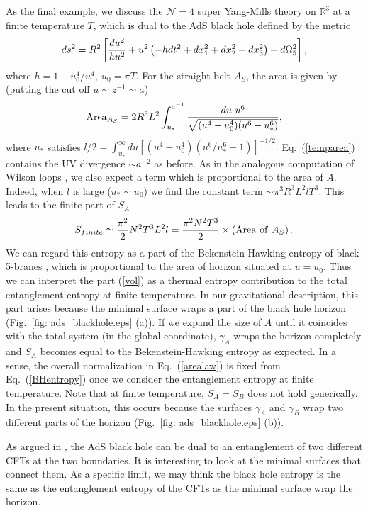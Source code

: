 \documentclass[twocolumn,amsmath,amssymb,nofootinbib,eqsecnum,tighten,prd]{revtex4}
\def\frac#1#2{{#1\over #2}}
\def\s{\sqrt}
\def\f {\frac}
\def\frac#1#2{{#1\over #2}}
\def\s{\sqrt}
\def\be{\begin{equation}}
\def\ee{\end{equation}}
\begin{document}
As the final example, we discuss the $\mathcal{N}=4$
super Yang-Mills theory on $\mathbb{R}^3$ at a finite
temperature $T$, which is dual to the AdS black hole
defined by the metric
\cite{Witten}
\be ds^2=R^2\left[\f{du^2}{hu^2}+u^2\left(-h
dt^2+dx_1^2+dx_2^2+dx_3^2\right)+d\Omega_5^2\right], \ee
where $h=1-u_0^4/u^4,\ u_0=\pi T$.
For the straight belt $A_{S}$,
the area is given by (putting the cut off $u\sim z^{-1}\sim a$)
\begin{eqnarray}
{\rm
Area}_{A_S}=2R^3L^2\int^{a^{-1}}_{u_*}
\f{du~ u^6}{\s{(u^4-u_0^4)(u^6-u_*^6)}}, \label{temparea}
\end{eqnarray}
where $u_*$ satisfies $ l/2=\int^{\infty}_{u_*}du
[(u^4-u_0^4)(u^6/u_*^6-1)]^{-1/2}. $ Eq.\ (\ref{temparea}) contains
the UV divergence $\sim a^{-2}$ as before. As in the analogous
computation of Wilson loops \cite{Wilsontemp}, we also expect a term
which is proportional to the area of $A$. Indeed, when $l$ is large
($u_*\sim u_0$) we find the constant term $\sim \pi^3R^3L^2lT^3$.
This leads to the finite part of  $S_A$ \be
S_{finite}\simeq\f{\pi^2}{2}N^2
T^3L^2l=\f{\pi^2N^2T^3}{2}\times\left({\rm Area~ of}~ A_{S}\right).
\label{vol}\ee We can regard this entropy as a part of the
Bekenstein-Hawking entropy of black 5-branes \cite{GKP}, which is
proportional to the area of horizon situated at $u=u_0$. Thus we can
interpret the part (\ref{vol}) as a thermal entropy contribution to
the total entanglement entropy at finite temperature. In our
gravitational description, this part arises because the minimal
surface wraps a part of the black hole horizon (Fig.\ \ref{fig:
ads_blackhole.eps} (a)). If we expand the size of $A$ until it
coincides with the total system (in the global coordinate),
$\gamma_A$ wraps the horizon completely and $S_A$ becomes equal to
the Bekenstein-Hawking entropy as expected. In a sense, the overall
normalization in Eq.\ (\ref{arealaw}) is fixed from Eq.\
(\ref{BHentropy}) once we consider the entanglement entropy at
finite temperature. Note that at finite temperature, $S_A = S_B$
does not hold generically. In the present situation, this occurs
because the surfaces $\gamma_A$ and $\gamma_B$ wrap two different
parts of the horizon (Fig.\ \ref{fig: ads_blackhole.eps} (b)).



As argued in \cite{MBH,Einhorn}, the AdS black hole can be dual to an entanglement
of two different CFTs at the two boundaries.  It is interesting to look at
the minimal surfaces
that connect them. As a specific limit, we may think the black hole
entropy is the same as the entanglement entropy of the CFTs  as the minimal surface
wrap the horizon.
\end{document}
